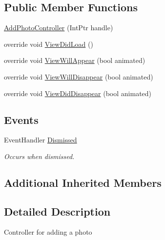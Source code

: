 \subsection*{Public Member Functions}
\begin{DoxyCompactItemize}
\item 
\hyperlink{class_field_service_1_1i_o_s_1_1_add_photo_controller_a9a6f2ffd465fc90c33d3575e98616230}{Add\+Photo\+Controller} (Int\+Ptr handle)
\item 
override void \hyperlink{class_field_service_1_1i_o_s_1_1_add_photo_controller_a2313a818ff8f62192f5a27bec451f4b9}{View\+Did\+Load} ()
\item 
override void \hyperlink{class_field_service_1_1i_o_s_1_1_add_photo_controller_a0ffc0da9c8cbbf4fb154f580dc5a4d20}{View\+Will\+Appear} (bool animated)
\item 
override void \hyperlink{class_field_service_1_1i_o_s_1_1_add_photo_controller_a8922af3b3adebaf687203014c0bec107}{View\+Will\+Disappear} (bool animated)
\item 
override void \hyperlink{class_field_service_1_1i_o_s_1_1_add_photo_controller_aff25340e5f010586f27618bcc330833d}{View\+Did\+Disappear} (bool animated)
\end{DoxyCompactItemize}
\subsection*{Events}
\begin{DoxyCompactItemize}
\item 
Event\+Handler \hyperlink{class_field_service_1_1i_o_s_1_1_add_photo_controller_a612a7cf78072a1fce03a13b8bc7c06be}{Dismissed}
\begin{DoxyCompactList}\small\item\em Occurs when dismissed. \end{DoxyCompactList}\end{DoxyCompactItemize}
\subsection*{Additional Inherited Members}


\subsection{Detailed Description}
Controller for adding a photo 



